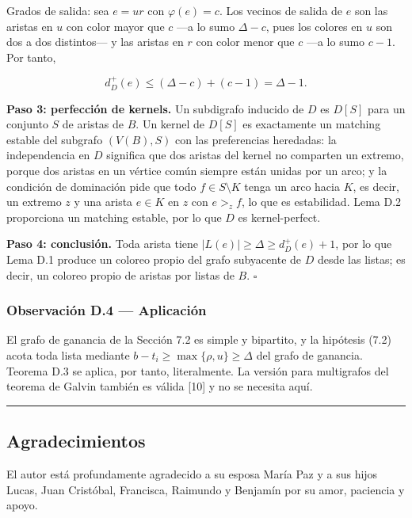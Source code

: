 \documentclass[
  11pt,
]{article}
\begin{document}
Grados de salida: sea \(e=ur\) con \(\varphi(e)=c\). Los vecinos de salida de \(e\) son las aristas en \(u\) con color mayor que \(c\) ---a lo sumo \(\Delta-c\), pues los colores en \(u\) son dos a dos distintos--- y las aristas en \(r\) con color menor que \(c\) ---a lo sumo \(c-1\). Por tanto,

\[
d^+_D(e)\le(\Delta-c)+(c-1)=\Delta-1.
\]

\textbf{Paso 3: perfección de kernels.} Un subdigrafo inducido de \(D\) es \(D[S]\) para un conjunto \(S\) de aristas de \(B\). Un kernel de \(D[S]\) es exactamente un matching estable del subgrafo \((V(B),S)\) con las preferencias heredadas: la independencia en \(D\) significa que dos aristas del kernel no comparten un extremo, porque dos aristas en un vértice común siempre están unidas por un arco; y la condición de dominación pide que todo \(f\in S\setminus K\) tenga un arco hacia \(K\), es decir, un extremo \(z\) y una arista \(e\in K\) en \(z\) con \(e>_zf\), lo que es estabilidad. Lema D.2 proporciona un matching estable, por lo que \(D\) es kernel-perfect.

\textbf{Paso 4: conclusión.} Toda arista tiene \(|L(e)|\ge\Delta\ge d^+_D(e)+1\), por lo que Lema D.1 produce un coloreo propio del grafo subyacente de \(D\) desde las listas; es decir, un coloreo propio de aristas por listas de \(B\). \(\square\)

\subsubsection{Observación D.4 --- Aplicación}\label{observaciuxf3n-d.4-aplicaciuxf3n}

El grafo de ganancia de la Sección 7.2 es simple y bipartito, y la hipótesis (7.2) acota toda lista mediante \(b-t_i\ge\max\{\rho,u\}\ge\Delta\) del grafo de ganancia. Teorema D.3 se aplica, por tanto, literalmente. La versión para multigrafos del teorema de Galvin también es válida {[}10{]} y no se necesita aquí.

\begin{center}\rule{0.5\linewidth}{0.5pt}\end{center}

\subsection{Agradecimientos}\label{agradecimientos}

El autor está profundamente agradecido a su esposa María Paz y a sus hijos Lucas, Juan Cristóbal, Francisca, Raimundo y Benjamín por su amor, paciencia y apoyo.
\end{document}
